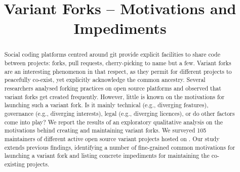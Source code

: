 

\pagestyle{fancy}
\fancyhead[r]{\thepage}




\title{Variant Forks -- Motivations and Impediments}

\author{
	}




\maketitle

\begin{abstract}
Social coding platforms centred around git provide explicit facilities to share code between projects: forks, pull requests, cherry-picking to name but a few. Variant forks are an interesting phenomenon in that respect, as they permit for different projects to peacefully co-exist, yet explicitly acknowledge the common ancestry. Several researchers analysed forking practices on open source platforms and observed that variant forks get created frequently. However, little is known on the motivations for launching such a variant fork. Is it mainly technical (e.g., diverging features), governance (e.g., diverging interests), legal (e.g., diverging licences), or do other factors come into play? We report the results of an exploratory qualitative analysis on the motivations behind creating and maintaining variant forks. We surveyed 105 maintainers of different active open source variant projects hosted on \gh. Our study extends previous findings, identifying a number of fine-grained common motivations for launching a variant fork and listing concrete impediments for maintaining the co-existing projects.
\end{abstract}

